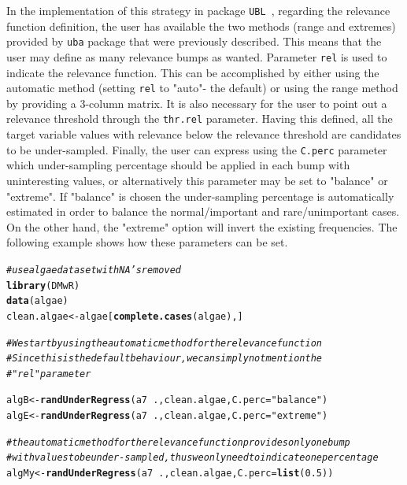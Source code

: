 \documentclass[10pt,a4paper]{article}\usepackage[]{graphicx}\usepackage[]{color}
\makeatletter
\newcommand{\hlnum}[1]{\textcolor[rgb]{0.686,0.059,0.569}{#1}}%
\newcommand{\hlstr}[1]{\textcolor[rgb]{0.192,0.494,0.8}{#1}}%
\newcommand{\hlcom}[1]{\textcolor[rgb]{0.678,0.584,0.686}{\textit{#1}}}%
\newcommand{\hlopt}[1]{\textcolor[rgb]{0,0,0}{#1}}%
\newcommand{\hlstd}[1]{\textcolor[rgb]{0.345,0.345,0.345}{#1}}%
\newcommand{\hlkwb}[1]{\textcolor[rgb]{0.69,0.353,0.396}{#1}}%
\newcommand{\hlkwc}[1]{\textcolor[rgb]{0.333,0.667,0.333}{#1}}%
\newcommand{\hlkwd}[1]{\textcolor[rgb]{0.737,0.353,0.396}{\textbf{#1}}}%
\newenvironment{kframe}{%
 \def\at@end@of@kframe{}%
 \ifinner\ifhmode%
  \def\at@end@of@kframe{\end{minipage}}%
  \begin{minipage}{\columnwidth}%
 \fi\fi%
 \def\FrameCommand##1{\hskip\@totalleftmargin \hskip-\fboxsep
 \colorbox{shadecolor}{##1}\hskip-\fboxsep
     \hskip-\linewidth \hskip-\@totalleftmargin \hskip\columnwidth}%
 \MakeFramed {\advance\hsize-\width
   \@totalleftmargin\z@ \linewidth\hsize
   \@setminipage}}%
 {\par\unskip\endMakeFramed%
 \at@end@of@kframe}
\newenvironment{knitrout}{}{} %
\newcommand{\UBL}{package \texttt{UBL}\ }
\makeatother
\begin{document}
In the implementation of this strategy in \UBL, regarding the relevance function definition, the user has available the two methods (range and extremes) provided by \texttt{uba} package that were previously described. This means that the user may define as many relevance bumps as wanted. Parameter \texttt{rel} is used to indicate the relevance function. This can be accomplished by either using the automatic method (setting \texttt{rel} to "auto"- the default) or using the range method by providing a 3-column matrix.  It is also necessary for the user to point out a relevance threshold through the \texttt{thr.rel} parameter. Having this defined, all the target variable values with relevance below the relevance threshold are candidates to be under-sampled. Finally, the user can express using the \texttt{C.perc} parameter which under-sampling percentage should be applied in each bump with uninteresting values, or alternatively this parameter may be set to "balance" or "extreme". If "balance" is chosen the under-sampling percentage is automatically estimated in order to balance the normal/important and rare/unimportant cases. On the other hand, the "extreme" option will invert the existing frequencies. The following example shows how these parameters can be set.

\begin{knitrout}\footnotesize
{}\color{fgcolor}\begin{kframe}
\begin{alltt}
\hlcom{# use algae data set with NA's removed}
\hlkwd{library}\hlstd{(DMwR)}
\hlkwd{data}\hlstd{(algae)}
\hlstd{clean.algae} \hlkwb{<-} \hlstd{algae[}\hlkwd{complete.cases}\hlstd{(algae),]}

\hlcom{# We start by using the automatic method for the relevance function}
\hlcom{# Since this is the default behaviour, we can simply not mention the}
\hlcom{# "rel" parameter}

\hlstd{algB} \hlkwb{<-} \hlkwd{randUnderRegress}\hlstd{(a7}\hlopt{~}\hlstd{., clean.algae,} \hlkwc{C.perc}\hlstd{=}\hlstr{"balance"}\hlstd{)}
\hlstd{algE} \hlkwb{<-} \hlkwd{randUnderRegress}\hlstd{(a7}\hlopt{~}\hlstd{., clean.algae,} \hlkwc{C.perc}\hlstd{=}\hlstr{"extreme"}\hlstd{)}

\hlcom{# the automatic method for the relevance function provides only one bump }
\hlcom{# with values to be under-sampled, thus we only need to indicate one percentage}
\hlstd{algMy} \hlkwb{<-} \hlkwd{randUnderRegress}\hlstd{(a7}\hlopt{~}\hlstd{., clean.algae,} \hlkwc{C.perc}\hlstd{=}\hlkwd{list}\hlstd{(}\hlnum{0.5}\hlstd{))}
\end{alltt}
\end{kframe}
\end{knitrout}
\end{document}

